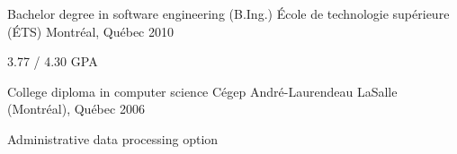 
\begin{cventries}

  \cventry
    {Bachelor degree in software engineering (B.Ing.)} %
    {École de technologie supérieure (ÉTS)} %
    {Montréal, Québec} %
    {2010} %
    {
      \begin{cvitems} %
        \item {3.77 / 4.30 GPA}
      \end{cvitems}
    }

  \cventry
    {College diploma in computer science} %
    {Cégep André-Laurendeau} %
    {LaSalle (Montréal), Québec} %
    {2006} %
    {
      \begin{cvitems} %
        \item {Administrative data processing option}
      \end{cvitems}
    }

\end{cventries}